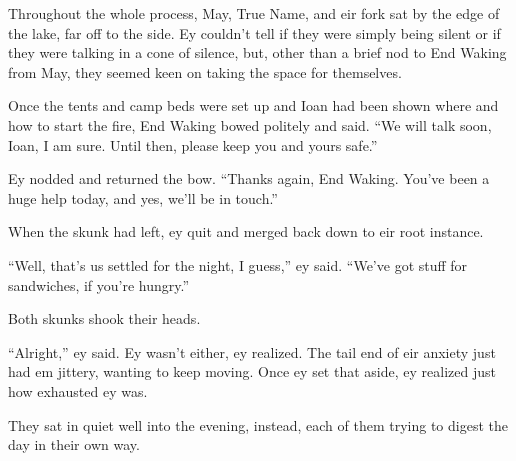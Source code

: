Throughout the whole process, May, True Name, and eir fork sat by the edge of the lake, far off to the side. Ey couldn't tell if they were simply being silent or if they were talking in a cone of silence, but, other than a brief nod to End Waking from May, they seemed keen on taking the space for themselves.

Once the tents and camp beds were set up and Ioan had been shown where and how to start the fire, End Waking bowed politely and said. ``We will talk soon, Ioan, I am sure. Until then, please keep you and yours safe.''

Ey nodded and returned the bow. ``Thanks again, End Waking. You've been a huge help today, and yes, we'll be in touch.''

When the skunk had left, ey quit and merged back down to eir root instance.

``Well, that's us settled for the night, I guess,'' ey said. ``We've got stuff for sandwiches, if you're hungry.''

Both skunks shook their heads.

``Alright,'' ey said. Ey wasn't either, ey realized. The tail end of eir anxiety just had em jittery, wanting to keep moving. Once ey set that aside, ey realized just how exhausted ey was.

They sat in quiet well into the evening, instead, each of them trying to digest the day in their own way.
